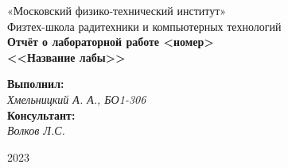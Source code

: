 
\pagecolor{default_color}


\pagecolor{white}
\pagestyle{fancy}
\fancyhf{}
\rfoot{}


\thispagestyle{empty}

\begin{center}
\large{«Московский физико-технический институт»} \\  
\large{Физтех-школа радитехники и компьютерных технологий }\\
\vspace*{6cm}
{\bfseries
    {\Huge Отчёт о лабораторной работе \textnumero <номер>  \\ <<Название лабы>>}
}
\end{center}

\vspace*{1cm}
\begin{flushright}
    \large{
    \textbf{Выполнил:} \\ \textit{ Хмельницкий А. А., БО1-306} \\
    \textbf{Консультант:} \\ \textit{Волков Л.С.}
    }
\end{flushright}

\vspace*{11cm}
\begin{center}
2023
\end{center}

\newpage
